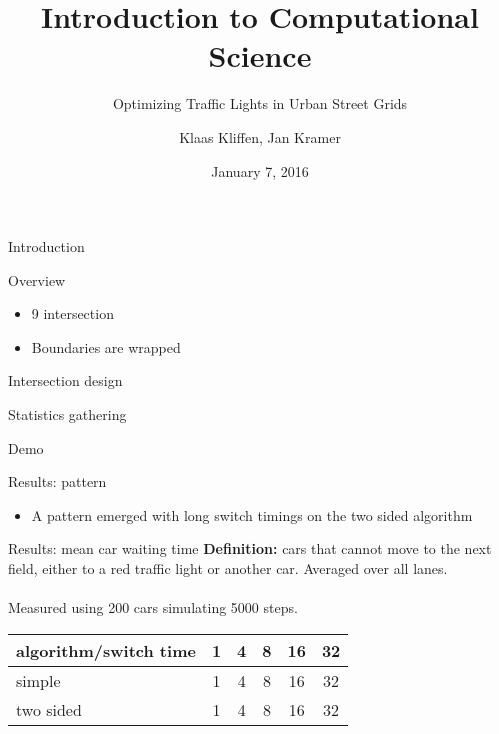 \documentclass[11pt]{beamer}
\title{Introduction to Computational Science}
\subtitle{Optimizing Traffic Lights in Urban Street Grids}
\author{Klaas Kliffen, Jan Kramer}
\date{January 7, 2016}
\begin{document}
\maketitle

\begin{frame}{Introduction}
\end{frame}

\begin{frame}{Overview}
\begin{itemize}
    \item 9 intersection
    \item Boundaries are wrapped
\end{itemize}
\end{frame}

\begin{frame}{Intersection design}
\end{frame}

\begin{frame}{Statistics gathering}
    
\end{frame}

\begin{frame}{Demo}

\end{frame}


\begin{frame}{Results: pattern}
\begin{itemize}
 \item A pattern emerged with long switch timings on the two sided algorithm
\end{itemize}
\end{frame}


\begin{frame}{Results: mean car waiting time}
\textbf{Definition:} cars that cannot move to the next field, either to a 
red traffic light or another car. Averaged over all lanes.\\~\\
Measured using 200 cars simulating 5000 steps.

\begin{table}
\centering
\begin{tabular}{l|c|c|c|c|c}
algorithm/switch time & 1 & 4 & 8 & 16 & 32\\
\hline
simple & 1 & 4 & 8 & 16 & 32\\
two sided & 1 & 4 & 8 & 16 & 32\\
\end{tabular}
\end{table}
 
\end{frame}
\end{document}
